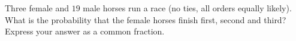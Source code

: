 Three female and $19$ male horses run a race (no ties, all orders equally likely). What is the probability that the female horses finish first, second and third? Express your answer as a common fraction.

